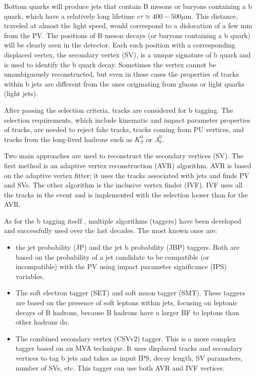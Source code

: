 Bottom quarks will produce jets that contain B mesons or baryons containing a b quark, which have a relatively long lifetime $c \tau \approx 400 - 500 \mu$m. This distance, traveled at almost the light speed, would correspond to a dislocation of a few mm from the PV. The positions of B meson decays (or baryons containing a b quark) will be clearly seen in the detector. Each such position with a corresponding displaced vertex, the secondary vertex (SV), is a unique signature of b quark and is used to identify the b quark decay. Sometimes the vertex cannot be unambiguously reconstructed, but even in these cases the properties of tracks within b jets are different from the ones originating from gluons or light quarks (light jets).

After passing the selection criteria, tracks are considered for b tagging. The selection requirements, which include kinematic and impact parameter properties of tracks, are needed to reject fake tracks, tracks coming from PU vertices, and tracks from the long-lived hadrons such as $K_S^0$ or $\Lambda_b^0$. 

Two main approaches are used to reconstruct the secondary vertices (SV). The first method is an adaptive vertex reconstruction (AVR) algorithm. AVR is based on the adaptive vertex fitter; it uses the tracks associated with jets and finds PV and SVs. The other algorithm is the inclusive vertex finder (IVF). IVF uses all the tracks in the event and is implemented with the selection looser than for the AVR. 

As for the b tagging itself \cite{CMS-PAS-BTV-15-001, Sirunyan:2017ezt}, multiple algorithms (taggers) have been developed and successfully used over the last decades. The most known ones are: 

\begin{itemize}
\item the jet probability (JP) and the jet b probability (JBP) taggers. Both are based on the probability of a jet candidate to be compatible (or incompatible) with the PV using impact parameter significance (IPS) variables.
\item The soft electron tagger (SET) and soft muon tagger (SMT). These taggers are based on the presence of soft leptons within jets, focusing on leptonic decays of B hadrons, because B hadrons have a larger BF to leptons than other hadrons do.
\item The combined secondary vertex (CSVv2) tagger. This is a more complex tagger based on an MVA technique. It uses displaced tracks and secondary vertices to tag b jets and takes as input IPS, decay length, SV parameters, number of SVs, etc. This tagger can use both AVR and IVF vertices.
\end{itemize}

